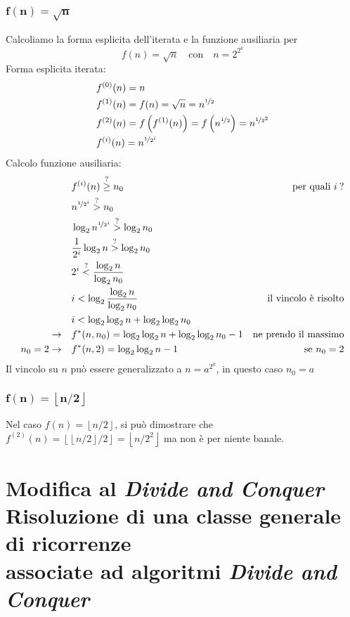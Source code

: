 \subsubsection{$\bm{f(n) = \sqrt{n}}$}
Calcoliamo la forma esplicita dell'iterata e la funzione ausiliaria per
\[ f(n) = \sqrt{n} \quad \text{con} \quad n=2^{2^k} \]
Forma esplicita iterata:
\begin{align*}
    & f^{(0)}(n) = n \\
    & f^{(1)}(n) = f(n) = \sqrt{n} = n^{\nicefrac{1}{2}} \\
    & f^{(2)}(n) = f \left( f^{(1)}(n) \right) = f \left( n^{\nicefrac{1}{2}} \right) = n^{\nicefrac{1}{2^2}} \\
    & f^{(i)}(n) = n^{\nicefrac{1}{2^i}} \\
\end{align*}
Calcolo funzione ausiliaria:
\begin{align*}
    & f^{(i)}(n) \overset{?}{\geq} n_0 
        & \text{per quali $i\:$?}\\
    & n^{\nicefrac{1}{2^i}} \overset{?}{>} n_0 \\
    & \log_2 n^{\nicefrac{1}{2^i}} \overset{?}{>} \log_2 n_0 \\
    & \frac{1}{2^i} \log_2 n \overset{?}{>} \log_2 n_0 \\
    & 2^i \overset{?}{<} \frac{\log_2 n}{\log_2 n_0} \\
    & i < \log_2 \frac{\log_2 n}{\log_2 n_0} 
        & \text{il vincolo è risolto} \\
    & i < \log_2 \log_2 n + \log_2 \log_2 n_0 \\
    \rightarrow \quad & f^*(n, n_0) = \log_2 \log_2 n + \log_2 \log_2 n_0 - 1
        & \text{ne prendo il massimo} \\
    n_0 = 2 \rightarrow \quad & f^*(n, 2) = \log_2 \log_2 n - 1
        & \text{se $n_0=2$}
\end{align*}
Il vincolo su $n$ può essere generalizzato a $n=a^{2^k}$, in questo caso $n_0 = a$

\subsubsection{$\bm{f(n) = \left\lfloor n/2 \right\rfloor}$}
Nel caso $f(n) = \left\lfloor n/2 \right\rfloor$, si può dimostrare che
$ f^{(2)}(n) = \left\lfloor \left\lfloor n/2 \right\rfloor / 2 \right\rfloor = \left\lfloor n / 2^2 \right\rfloor $
ma non è per niente banale.

\section
[Modifica al \textit{Divide and Conquer}]
{Modifica al \textit{Divide and Conquer} \\ 
{ \large Risoluzione di una classe generale di ricorrenze\\ associate ad algoritmi \textit{Divide and Conquer} } }
